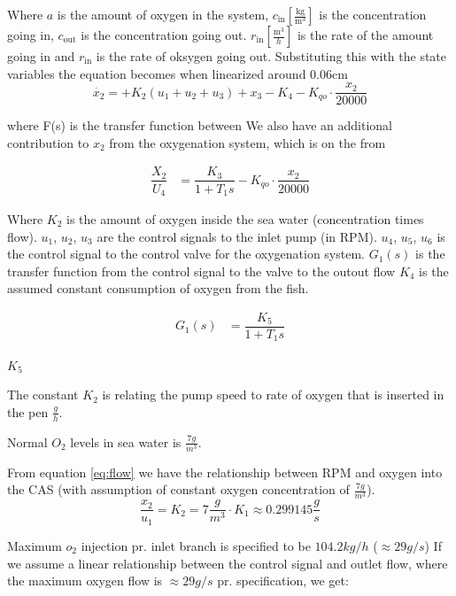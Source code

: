 \documentclass{article}
\begin{document}
Where $a$ is the amount of oxygen in the system, $c_\text{in} \left[ \frac{\text{kg}}{\text{m}^3} \right] $ is the concentration going in, 
$c_\text{out}$ is the concentration going out. $r_\text{in}\left[ \frac{\text{m}^3}{h} \right]$ is the rate of the amount going in and 
$r_\text{in}$ is the rate of oksygen going out.
Substituting this with the state variables the equation becomes when linearized around 0.06cm
\begin{equation} \label{eq:ox_simp}
    \dot{x_2} =  +K_2(u_1+u_2+u_3) + x_3 -K_4-K_{qo}\cdot \dfrac{x_2}{20000}
\end{equation}

where F(s) is the transfer function between
We also have an additional contribution to $x_2$ from the oxygenation system, which is on the from

\begin{align*}
    \dfrac{X_2}{U_4} &= \dfrac{K_3}{1+T_1s}-K_{qo}\cdot \dfrac{x_2}{20000}
\end{align*}


Where $K_2$ is the amount of oxygen inside the sea water (concentration times flow). $u_1$, $u_2$, $u_3$ are the control signals to the inlet pump (in RPM). 
$u_4$, $u_5$, $u_6$ is the control signal to the control valve for the oxygenation system.
$G_1(s)$ is the transfer function from the control signal to the valve to the outout flow
$K_4$ is the assumed constant consumption of oxygen from the fish.\newline

\begin{align} \label{eq:valve}
    G_1(s)&=\dfrac{K_5}{1+T_1s}
\end{align}

$K_5$

The constant $K_2$ is relating the pump speed to rate of oxygen that is inserted in the pen $\frac{g}{h}$.

Normal $O_2$ levels in sea water is $\frac{7g}{m^3}$.

From equation \ref{eq:flow} we have the relationship between RPM and oxygen into the CAS (with assumption of constant oxygen concentration of $\frac{7g}{m^3}$). \newline
\begin{equation}
    \dfrac{x_2}{u_1} = K_2 =  7\frac{g}{m^3} \cdot K_1 \approx 0.299145\frac{g}{s}
\end{equation}



Maximum $o_2$ injection pr. inlet branch is specified to be $104.2kg/h$ ($\approx 29g/s$)
If we assume a linear relationship between the control signal and outlet flow, where the maximum oxygen flow is $\approx 29g/s$ pr. specification, we get:
\end{document}

